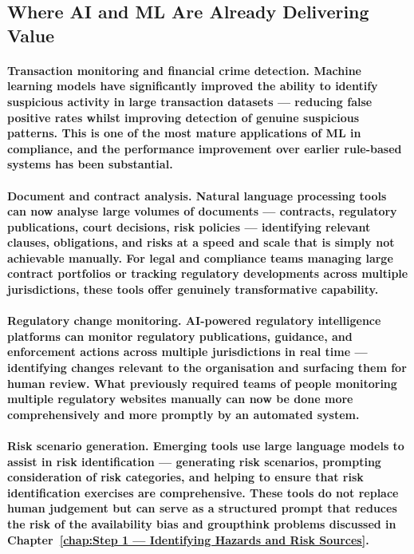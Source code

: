 \subsection{Where AI and ML Are Already Delivering Value}
\paragraph{\textbf{Transaction monitoring and financial crime detection}. Machine learning models have significantly improved the ability to identify suspicious activity in large transaction datasets — reducing false positive rates whilst improving detection of genuine suspicious patterns. This is one of the most mature applications of ML in compliance, and the performance improvement over earlier rule-based systems has been substantial.}
\paragraph{\textbf{Document and contract analysis}. Natural language processing tools can now analyse large volumes of documents — contracts, regulatory publications, court decisions, risk policies — identifying relevant clauses, obligations, and risks at a speed and scale that is simply not achievable manually. For legal and compliance teams managing large contract portfolios or tracking regulatory developments across multiple jurisdictions, these tools offer genuinely transformative capability.}
\paragraph{\textbf{Regulatory change monitoring}. AI-powered regulatory intelligence platforms can monitor regulatory publications, guidance, and enforcement actions across multiple jurisdictions in real time — identifying changes relevant to the organisation and surfacing them for human review. What previously required teams of people monitoring multiple regulatory websites manually can now be done more comprehensively and more promptly by an automated system.}
\paragraph{\textbf{Risk scenario generation}. Emerging tools use large language models to assist in risk identification — generating risk scenarios, prompting consideration of risk categories, and helping to ensure that risk identification exercises are comprehensive. These tools do not replace human judgement but can serve as a structured prompt that reduces the risk of the availability bias and groupthink problems discussed in Chapter~\ref{chap:Step 1 — Identifying Hazards and Risk Sources}.}

